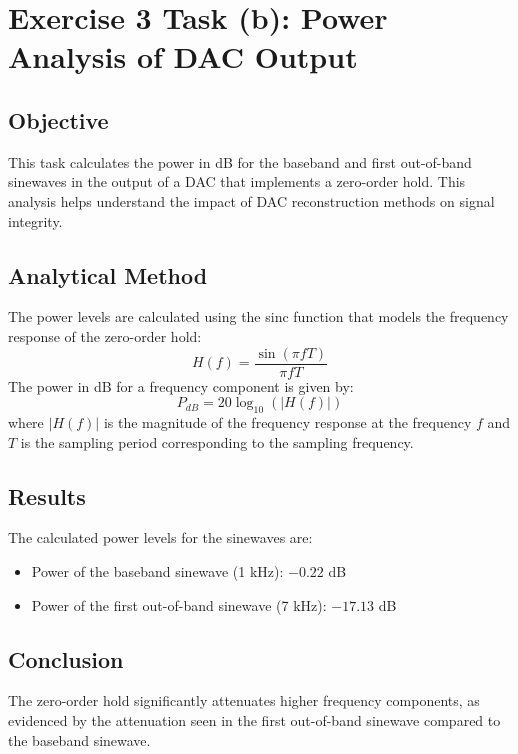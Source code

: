\item[(b)]
\section*{Exercise 3 Task (b): Power Analysis of DAC Output}

\subsection*{Objective}
This task calculates the power in dB for the baseband and first out-of-band sinewaves in the output of a DAC that implements a zero-order hold.
This analysis helps understand the impact of DAC reconstruction methods on signal integrity.

\subsection*{Analytical Method}
The power levels are calculated using the sinc function that models the frequency response of the zero-order hold:
\[
H(f) = \frac{\sin(\pi f T)}{\pi f T}
\]
The power in dB for a frequency component is given by:
\[
P_{dB} = 20 \log_{10}(|H(f)|)
\]
where \(|H(f)|\) is the magnitude of the frequency response at the frequency \(f\)
and \( T \) is the sampling period corresponding to the sampling frequency.

\subsection*{Results}
The calculated power levels for the sinewaves are:
\begin{itemize}
\item Power of the baseband sinewave (1 kHz): \( -0.22 \) dB
\item Power of the first out-of-band sinewave (7 kHz): \( -17.13 \) dB
\end{itemize}

\subsection*{Conclusion}
The zero-order hold significantly attenuates higher frequency components, as evidenced by the attenuation seen in the first out-of-band sinewave compared to the baseband sinewave.